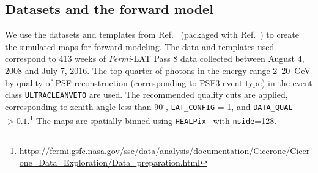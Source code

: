\documentclass[prd,aps,10pt,nofootinbib,twocolumn,superscriptaddress,preprintnumbers,balancelastpage,longbibliography]{revtex4-1}
\begin{document}
\subsection{Datasets and the forward model}
\label{sec:datasets}

We use the datasets and templates from Ref.~\cite{rodd_nicholas_safdi_siddharth_2016} (packaged with Ref.~\cite{Mishra-Sharma:2016gis}) to create the simulated maps for forward modeling. The data and templates used correspond to 413 weeks of \emph{Fermi}-LAT Pass 8 data collected between August 4, 2008 and July 7, 2016. The top quarter of photons in the energy range 2--20~GeV by quality of PSF reconstruction (corresponding to PSF3 event type) in the event class \texttt{ULTRACLEANVETO} are used. The recommended quality cuts are applied, corresponding to zenith angle less than 90$^\circ$, \texttt{LAT\_CONFIG} = 1, and \texttt{DATA\_QUAL} $> 0.1$.\footnote{\url{https://fermi.gsfc.nasa.gov/ssc/data/analysis/documentation/Cicerone/Cicerone_Data_Exploration/Data_preparation.html}} The maps are spatially binned using \texttt{HEALPix}~\cite{Gorski:2004by} with \texttt{nside}=128.
\end{document}

